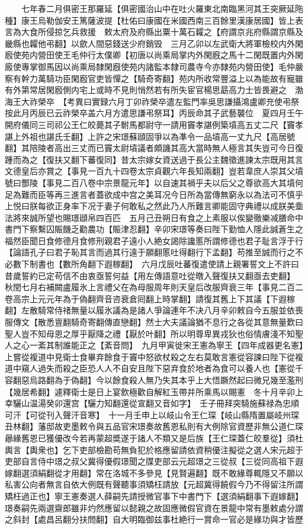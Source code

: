 　　七年春二月俱密王那羅延【俱密國治山中在吐火羅東北南臨黑河其王突厥延陁種】康王烏勒伽安王篤薩波提【杜佑曰康國在米國西南三百餘里漢康居國】皆上表言為大食所侵掠乞兵救援　敕太府及府縣出粟十萬石糶之【府謂京兆府縣謂京縣及畿縣也糶他弔翻】以歛人間惡錢送少府銷毁　三月乙卯以左武衛大將軍檢校内外閑廏使苑内營田使王毛仲行太僕卿【初唐以尚乘局掌内外閑廐之馬十二閑既置内外閑廄使專掌御馬因以尚乘局隸閑廐使苑内諸監本隸司農寺今亦隸苑内營田使】毛仲嚴察有幹力萬騎功臣閑廏官吏皆憚之【騎奇寄翻】苑内所收常豐溢上以為能故有寵雖有外第常居閑廏側内宅上或時不見則悄然若有所失宦官楊思勗高力士皆畏避之　渤海王大祚榮卒　【考異曰實録六月丁卯祚榮卒遣左監門率吳思謙攝鴻盧卿充使弔祭按此月丙辰已云祚榮卒盖六月方遣思謙弔祭耳】丙辰命其子武藝襲位　夏四月壬午開府儀同三司祁公王仁皎薨其子駙馬都尉守一請用竇孝諶例築墳高五丈二尺【竇孝諶上外祖也諶氏壬翻】上許之宋璟蘇頲固爭以為凖令一品墳高一丈九尺【高居號翻】其陪陵者高出三丈而已竇太尉墳議者頗譏其高大當時無人極言其失豈可今日復踵而為之【復扶又翻下蕃復同】昔太宗嫁女資送過于長公主魏徵進諫太宗既用其言文德皇后亦賞之【事見一百九十四卷太宗貞觀六年長知兩翻】豈若韋庶人崇其父墳號曰酆陵【事見二百八卷中宗景龍元年】以自速其禍乎夫以后父之尊欲高大其墳何足為難而臣等再三進言者蓋欲成中宫之美耳况今日所為當傳無窮永以為法可不慎乎上悦曰朕每欲正身率下况于妻子何敢私之然此乃人所難言卿能固守典禮以成朕美埀法將來誠所望也賜璟頲帛四百匹　五月己丑朔日有食之上素服以俟變徹樂减膳命中書門下察繫囚賑饑乏勸農功【賑津忍翻】辛卯宋璟等奏曰陛下勤恤人隱此誠蒼生之福然臣聞日食修德月食修刑親君子遠小人絶女謁除讒慝所謂修德也君子耻言浮于行【論語孔子曰君子恥其言而過其行遠于願翻慝吐得翻行下孟翻】苟推至誠而行之不必數下制書也【數所角翻下遐稼翻】　六月戊辰吐蕃復遣使請上親署誓文上不許曰昔歲誓約已定苟信不由衷亟誓何益【用左傳語意吐從暾入聲復扶又翻亟去吏翻】　秋閏七月右補闕盧履氷上言禮父在為母服周年則天皇后改服齊衰三年【事見二百二卷高宗上元元年為于偽翻齊音咨衰倉囘翻上時掌翻】請復其舊上下其議【下遐稼翻】左散騎常侍禇無量以履氷議為是諸人爭論連年不决八月辛卯敕自今五服並依喪服傳文【散悉亶翻騎奇寄翻傳直戀翻】然士大夫議論猶不息行之各從其意無量歎曰聖人豈不知母恩之厚乎厭降之禮【厭於叶翻】所以明尊卑異戎狄也俗情膚淺不知聖人之心一紊其制誰能正之【紊音問】　九月甲寅徙宋王憲為寧王【四年成器更名憲】上嘗從複道中見衛士食畢弃餘食于竇中怒欲杖殺之左右莫敢言憲從容諫曰陛下從複道中窺人過失而殺之臣恐人人不自安且陛下惡弃食於地者為食可以養人也【憲從千容翻惡烏路翻為于偽翻】今以餘食殺人無乃失其本乎上大悟蹶然起曰微兄幾至濫刑【幾居希翻】遽釋衛士是日上宴飲極歡自解紅玉帶并所乘馬以賜憲　冬十月辛卯上幸驪山温湯癸卯還宫【驪力知翻還從宣翻又音如字】　壬子冊拜突騎施蘇禄為忠順可汗【可從刊入聲汗音寒】　十一月壬申上以岐山令王仁琛【岐山縣隋置屬岐州琛丑林翻】藩邸故吏墨敕令與五品官宋璟奏故舊恩私則有大例除官資歷非無公道仁琛曏緣舊恩已獲優改今若再蒙超奬遂于諸人不類又是后族【王仁琛蓋仁皎羣從】須杜輿言【輿衆也】乞下吏部檢勘苟無負犯於格應留請依資稍優注擬從之選人宋元超于吏部自言侍中璟之叔父冀得優假璟聞之牒吏部云元超璟之三從叔【三從同高祖下遐嫁翻選須絹翻從才用翻】常在洛城不多參見【見賢遍翻】既不敢緣尊輒隱又不願以私害公向者無言自依大例既有聲聽事須矯枉請放【元超冀得饒假今乃不得留注所謂矯枉過正也】寧王憲奏選人薛嗣先請授微官事下中書門下【選須絹翻事下遐嫁翻】璟奏嗣先兩選齋郎雖非灼然應留以懿親之故固應微假官資在景龍中常有墨敕處分謂之斜封【處昌呂翻分扶問翻】自大明臨御兹事杜絶行一賞命一官必是緣功與才皆歷